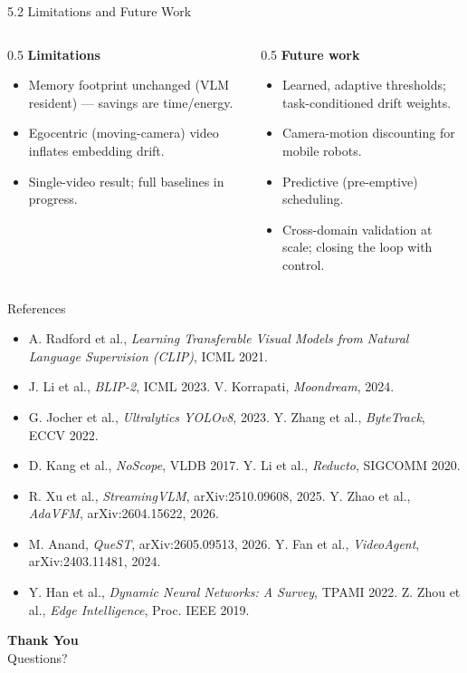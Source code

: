 \documentclass[11pt,aspectratio=169]{beamer}
\begin{document}
\begin{frame}{5.2 Limitations and Future Work}
\begin{columns}[T]
\begin{column}{0.5\textwidth}
\textbf{Limitations}
\begin{itemize}\footnotesize
  \item Memory footprint unchanged (VLM resident) --- savings are time/energy.
  \item Egocentric (moving-camera) video inflates embedding drift.
  \item Single-video result; full baselines in progress.
\end{itemize}
\end{column}
\begin{column}{0.5\textwidth}
\textbf{Future work}
\begin{itemize}\footnotesize
  \item Learned, adaptive thresholds; task-conditioned drift weights.
  \item Camera-motion discounting for mobile robots.
  \item Predictive (pre-emptive) scheduling.
  \item Cross-domain validation at scale; closing the loop with control.
\end{itemize}
\end{column}
\end{columns}
\end{frame}

\begin{frame}{References}
\footnotesize
\begin{itemize}
  \item A. Radford et al., \emph{Learning Transferable Visual Models from Natural Language Supervision (CLIP)}, ICML 2021.
  \item J. Li et al., \emph{BLIP-2}, ICML 2023. \quad V. Korrapati, \emph{Moondream}, 2024.
  \item G. Jocher et al., \emph{Ultralytics YOLOv8}, 2023. \quad Y. Zhang et al., \emph{ByteTrack}, ECCV 2022.
  \item D. Kang et al., \emph{NoScope}, VLDB 2017. \quad Y. Li et al., \emph{Reducto}, SIGCOMM 2020.
  \item R. Xu et al., \emph{StreamingVLM}, arXiv:2510.09608, 2025. \quad Y. Zhao et al., \emph{AdaVFM}, arXiv:2604.15622, 2026.
  \item M. Anand, \emph{QueST}, arXiv:2605.09513, 2026. \quad Y. Fan et al., \emph{VideoAgent}, arXiv:2403.11481, 2024.
  \item Y. Han et al., \emph{Dynamic Neural Networks: A Survey}, TPAMI 2022. \quad Z. Zhou et al., \emph{Edge Intelligence}, Proc. IEEE 2019.
\end{itemize}
\end{frame}

\begin{frame}[plain]
  \centering
  \vfill
  {\Huge\color{iiitanavy}\textbf{Thank You}}\\[4mm]
  {\large Questions?}
  \vfill
\end{frame}
\end{document}
